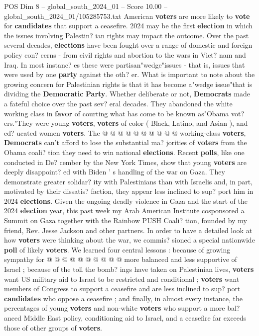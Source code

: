 \begin{textsample}{POS Dim 8 – global\_south\_2024\_01 – Score 10.00 – global\_south\_2024\_01/105285753.txt}  \label{ex:f8_pos_279}
American \textbf{voters} are more likely to \textbf{vote} for \textbf{candidates} that support a ceasefire. 2024 may be the first \textbf{election} in which the issues involving Palestin? ian rights may impact the outcome.
Over the past several decades, \textbf{elections} have been fought over a range of domestic and foreign policy con? cerns - from civil rights and abortion to the wars in Viet? nam and Iraq.
In most instanc? es these were partisan"wedge"issues - that is, issues that were used by one \textbf{party} against the oth? er.
What is important to note about the growing concern for Palestinian rights is that it has become a"wedge issue"that is dividing the \textbf{Democratic} \textbf{Party}.
Whether deliberate or not, \textbf{Democrats} made a fateful choice over the past sev? eral decades.
They abandoned the white working class in \textbf{favor} of courting what has come to be known as"Obama vot? ers."They were young \textbf{voters}, \textbf{voters} of color ( Black, Latino, and Asian ), and ed? ucated women \textbf{voters}.
The @ @ @ @ @ @ @ @ @ @ working-class \textbf{voters}, \textbf{Democrats} can't afford to lose the substantial ma? jorities of \textbf{voters} from the Obama coali? tion they need to win national \textbf{elections}.
Recent \textbf{polls}, like one conducted in De? cember by the New York Times, show that young \textbf{voters} are deeply disappoint? ed with Biden ' s handling of the war on Gaza.
They demonstrate greater solidar? ity with Palestinians than with Israelis and, in part, motivated by their dissatis? faction, they appear less inclined to sup? port him in 2024 \textbf{elections}.
Given the ongoing deadly violence in Gaza and the start of the 2024 \textbf{election} year, this past week my Arab American Institute cosponsored a Summit on Gaza together with the Rainbow PUSH Coali? tion, founded by my friend, Rev.
Jesse Jackson and other partners.
In order to have a detailed look at how \textbf{voters} were thinking about the war, we commis? sioned a special nationwide \textbf{poll} of likely \textbf{voters}.
We learned four central lessons : because of growing sympathy for @ @ @ @ @ @ @ @ @ @ more balanced and less supportive of Israel ; because of the toll the bomb? ings have taken on Palestinian lives, \textbf{voters} want US military aid to Israel to be restricted and conditional ; \textbf{voters} want members of Congress to support a ceasefire and are less inclined to sup? port \textbf{candidates} who oppose a ceasefire ; and finally, in almost every instance, the percentages of young \textbf{voters} and non-white \textbf{voters} who support a more bal? anced Middle East policy, conditioning aid to Israel, and a ceasefire far exceeds those of other groups of \textbf{voters}.

\end{textsample}
